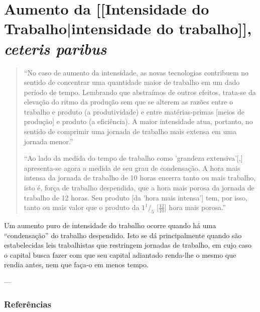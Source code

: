 \section{Aumento da [[Intensidade do Trabalho|intensidade do trabalho]], \textit{ceteris paribus}}
\begin{quote}
``No caso de aumento da intensidade, as novas tecnologias contribuem no sentido de concentrar uma quantidade maior de trabalho em um dado período de tempo. Lembrando que abstraímos de outros efeitos, trata-se da elevação do ritmo da produção sem que se alterem as razões entre o trabalho e produto (a produtividade) e entre matérias-primas [meios de produção] e produto (a eficiência). A maior intensidade atua, portanto, no sentido de comprimir uma jornada de trabalho mais extensa em uma jornada menor.'' \parencite[p. 234]{SaBarreto2021a}

``Ao lado da medida do tempo de trabalho como 'grandeza extensiva'[,] apresenta-se agora a medida de seu grau de condensação. A hora mais intensa da jornada de trabalho de 10 horas encerra tanto ou mais trabalho, isto é, força de trabalho despendida, que a hora mais porosa da jornada de trabalho de 12 horas. Seu produto [da 'hora mais intensa'] tem, por isso, tanto ou mais valor que o produto da $1 ^1/_{5}$ [$\frac{12}{10}$] hora mais porosa.'' \parencite[p. 482-3]{Marx2017}
\end{quote}

Um aumento puro de intensidade do trabalho ocorre quando há uma ``condensação'' do trabalho despendido. Isto se dá principalmente quando são estabelecidas leis trabalhistas que restringem jornadas de trabalho, em cujo caso o capital busca fazer com que seu capital adiantado renda-lhe o mesmo que rendia antes, nem que faça-o em menos tempo.

---
\subsubsection{Referências}
